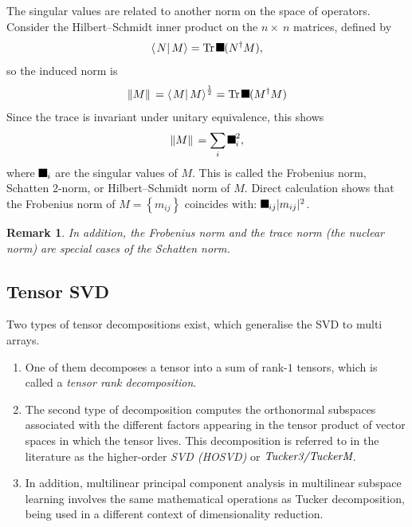 \documentclass[aps,preprint]{revtex4}%
\providecommand{\U}[1]{\protect\rule{.1in}{.1in}}
\newtheorem{remark}[theorem]{Remark}
\begin{document}
The singular values are related to another norm on the space of operators.
Consider the Hilbert--Schmidt inner product on the $n\times\ n$ matrices,
defined by%
\begin{equation}
\left\langle \left.  N\right\vert M\right\rangle =\operatorname{Tr}\U{2061}
(N^{\dagger}M),
\end{equation}
so the induced norm is%
\begin{equation}
\Vert M\Vert\,=\left\langle \left.  M\right\vert M\right\rangle ^{\frac{1}{2}%
}=\operatorname{Tr}\U{2061} (M^{\dagger}M)
\end{equation}
Since the trace is invariant under unitary equivalence, this shows%
\begin{equation}
\Vert M\Vert\,=\sum_{i}\U{3c3} _{i}^{2},
\end{equation}
where $\U{3c3} _{i}$ are the singular values of $M$. This is called the
Frobenius norm, Schatten $2$-norm, or Hilbert--Schmidt norm of $M$. Direct
calculation shows that the Frobenius norm of $M=\left\{  m_{ij}\right\}  $
coincides with: $\U{2211} _{ij}|m_{ij}|^{2}$.

\begin{remark}
In addition, the Frobenius norm and the trace norm (the nuclear norm) are
special cases of the Schatten norm.
\end{remark}

\subsection{Tensor SVD}

Two types of tensor decompositions exist, which generalise the SVD to multi arrays.

\begin{enumerate}
\item One of them decomposes a tensor into a sum of rank-$1$ tensors, which is
called a \emph{tensor rank decomposition}.

\item The second type of decomposition computes the orthonormal subspaces
associated with the different factors appearing in the tensor product of
vector spaces in which the tensor lives. This decomposition is referred to in
the literature as the higher-order \emph{SVD (HOSVD)} or
$\emph{Tucker3/TuckerM}$.

\item In addition, multilinear principal component analysis in multilinear
subspace learning involves the same mathematical operations as Tucker
decomposition, being used in a different context of dimensionality reduction.
\end{enumerate}
\end{document}
